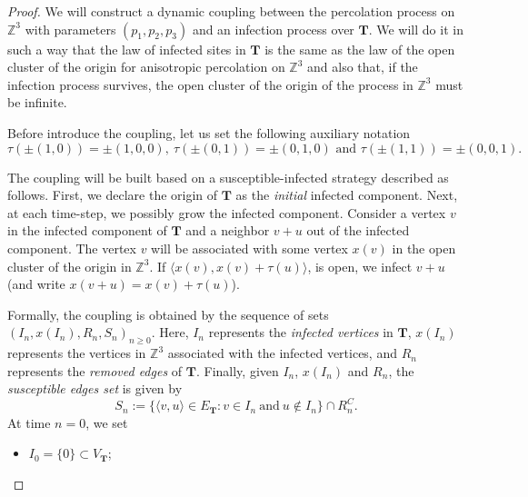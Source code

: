 \documentclass{aptpub}
\newcommand{\Z}{\mathbb{Z}}
\begin{document}
\begin{proof}
We will construct a dynamic coupling between the percolation process on $\Z^{3}$ with parameters $(p_1,p_2, p_3)$  and an infection process over $\mathbf{T}$.  We will do it in such a way that the law of infected sites in $\mathbf{T}$ is the same as the law of the open cluster of the origin for anisotropic percolation on $\Z^3$ and also that, if the infection process survives, the open cluster of the origin of the process in $\Z^3$ must be infinite. 

Before introduce the coupling, let us set the following auxiliary notation
\begin{equation}\label{eq:tau}
\tau(\pm(1,0))=\pm (1,0,0), \: \tau(\pm(0,1))=\pm (0,1,0) \mbox{ and } \tau(\pm(1,1))=\pm (0,0,1) .
\end{equation}

The coupling will be built based on a susceptible-infected strategy described as follows. First, we declare  the origin of $\mathbf{T}$ as the \textit{initial} infected component. Next, at each time-step, we possibly grow the infected component. %
Consider a vertex $v$ in the infected component of $\mathbf{T}$ and a neighbor $v+u$ out of the infected component. The vertex $v$ will be associated with some vertex $x(v)$ in the  open cluster of the origin in $\Z^3$. If $\langle x(v), x(v)+\tau(u) \rangle$,  is open, we infect $v+u$  (and write $x(v+u) = x(v) + \tau(u)$).





Formally, the coupling is obtained by the sequence of sets $(I_n, x(I_n), R_n, S_n)_{n \geq 0}$. Here, $I_n$ represents the \textit{infected vertices} in $\mathbf{T}$, $x(I_n)$ represents the vertices in $\Z^{3}$ associated with the infected vertices, and $R_n$ represents the \textit{removed edges} of $\mathbf{T}$. Finally, given $I_n$, $x(I_n)$ and $R_n$, the \textit{susceptible edges set} is given by
\begin{equation*}
    S_{n} := \{ \langle v, u \rangle \in E_{\mathbf{T}}: v \in I_{n} \: \mbox{and} \: u \notin I_{n} \} \cap R_{n}^C.
\end{equation*}
At time $n=0$, we set
\begin{itemize}
    \item $I_0 = \{0\} \subset V_{\mathbf{T}}$; 
    

\end{itemize}
\end{proof}
\end{document}
